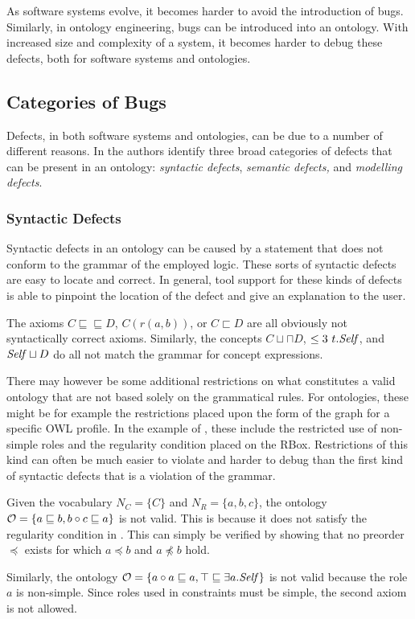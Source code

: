 
As software systems evolve, it becomes harder to avoid the introduction of bugs. Similarly, in ontology engineering, bugs can be introduced into an ontology. With increased size and complexity of a system, it becomes harder to debug these defects, both for software systems and ontologies.

\subsection{Categories of Bugs} \label{categories-of-bugs}

Defects, in both software systems and ontologies, can be due to a number of different reasons. In \cite{kalyanpur2005debugging} the authors identify three broad categories of defects that can be present in an ontology: \emph{syntactic defects}, \emph{semantic defects,} and \emph{modelling defects}.

\subsubsection{Syntactic Defects} \label{syntactic-defects}

Syntactic defects in an ontology can be caused by a statement that does not conform to the grammar of the employed logic. These sorts of syntactic defects are easy to locate and correct. In general, tool support for these kinds of defects is able to pinpoint the location of the defect and give an explanation to the user.

\begin{example}
  The axioms $C \sqsubseteq \sqsubseteq D$, $C(r(a, b))$, or $C \sqsubset D$ are all obviously not syntactically correct \SROIQ axioms. Similarly, the concepts $C \sqcup \sqcap D$, $\leq 3~t.\mathit{Self}$, and $\mathit{Self} \sqcup D$ do all not match the grammar for concept expressions.
\end{example}

There may however be some additional restrictions on what constitutes a valid ontology that are not based solely on the grammatical rules. For ontologies, these might be for example the restrictions placed upon the form of the graph for a specific OWL profile. In the example of \SROIQ, these include the restricted use of non-simple roles and the regularity condition placed on the RBox. Restrictions of this kind can often be much easier to violate and harder to debug than the first kind of syntactic defects that is a violation of the grammar.

\begin{example}
  Given the vocabulary $N_C = \{ C \}$ and $N_R = \{ a, b, c \}$, the \SROIQ ontology $\mathcal{O} = \{ a \sqsubseteq b, b \circ c \sqsubseteq a \}$ is not valid. This is because it does not satisfy the regularity condition in \SROIQ. This can simply be verified by showing that no preorder $\preceq$ exists for which $a \preceq b$ and $a \not\preceq b$ hold.

  Similarly, the ontology $\mathcal{O} = \{ a \circ a \sqsubseteq a, \top \sqsubseteq \exists a.\mathit{Self} \}$ is not valid because the role $a$ is non-simple. Since roles used in \self constraints must be simple, the second axiom is not allowed.
\end{example}

